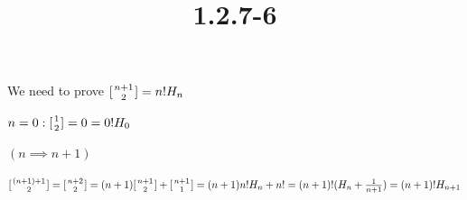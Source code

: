 \documentclass{article}
\title{1.2.7-6}
\begin{document}
\maketitle

We need to prove $[{n + 1 \atop 2}] = n! H_n$

$n = 0: [{1 \atop 2}] = 0 = 0! H_0$

$(n \implies n + 1)$

$[{(n + 1)+1 \atop 2}] = [{n + 2 \atop 2}] = (n + 1) [{n + 1 \atop 2}] + [{n + 1 \atop 1}] = (n+1)n!H_n + n! = (n+1)!(H_n + \frac{1}{n+1})=(n+1)!H_{n+1}$
\end{document}

